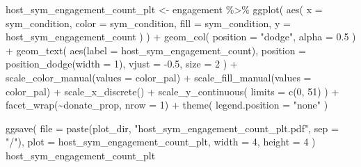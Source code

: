 \documentclass[
]{book}
\newenvironment{Shaded}{\begin{snugshade}}{\end{snugshade}}
\newcommand{\AttributeTok}[1]{\textcolor[rgb]{0.77,0.63,0.00}{#1}}
\newcommand{\DecValTok}[1]{\textcolor[rgb]{0.00,0.00,0.81}{#1}}
\newcommand{\FloatTok}[1]{\textcolor[rgb]{0.00,0.00,0.81}{#1}}
\newcommand{\FunctionTok}[1]{\textcolor[rgb]{0.00,0.00,0.00}{#1}}
\newcommand{\NormalTok}[1]{#1}
\newcommand{\OtherTok}[1]{\textcolor[rgb]{0.56,0.35,0.01}{#1}}
\newcommand{\SpecialCharTok}[1]{\textcolor[rgb]{0.00,0.00,0.00}{#1}}
\newcommand{\StringTok}[1]{\textcolor[rgb]{0.31,0.60,0.02}{#1}}
\begin{document}
\begin{Shaded}
\begin{Highlighting}[]
\NormalTok{host\_sym\_engagement\_count\_plt }\OtherTok{\textless{}{-}}\NormalTok{ engagement }\SpecialCharTok{\%\textgreater{}\%}
  \FunctionTok{ggplot}\NormalTok{(}
    \FunctionTok{aes}\NormalTok{(}
      \AttributeTok{x =}\NormalTok{ sym\_condition,}
      \AttributeTok{color =}\NormalTok{ sym\_condition,}
      \AttributeTok{fill =}\NormalTok{ sym\_condition,}
      \AttributeTok{y =}\NormalTok{ host\_sym\_engagement\_count}
\NormalTok{    )}
\NormalTok{  ) }\SpecialCharTok{+}
  \FunctionTok{geom\_col}\NormalTok{(}
    \AttributeTok{position =} \StringTok{"dodge"}\NormalTok{,}
    \AttributeTok{alpha =} \FloatTok{0.5}
\NormalTok{  ) }\SpecialCharTok{+}
  \FunctionTok{geom\_text}\NormalTok{(}
    \FunctionTok{aes}\NormalTok{(}\AttributeTok{label =}\NormalTok{ host\_sym\_engagement\_count),}
    \AttributeTok{position =} \FunctionTok{position\_dodge}\NormalTok{(}\AttributeTok{width =} \DecValTok{1}\NormalTok{),}
    \AttributeTok{vjust =} \SpecialCharTok{{-}}\FloatTok{0.5}\NormalTok{,}
    \AttributeTok{size =} \DecValTok{2}
\NormalTok{  ) }\SpecialCharTok{+}
  \FunctionTok{scale\_color\_manual}\NormalTok{(}\AttributeTok{values =}\NormalTok{ color\_pal) }\SpecialCharTok{+}
  \FunctionTok{scale\_fill\_manual}\NormalTok{(}\AttributeTok{values =}\NormalTok{ color\_pal) }\SpecialCharTok{+}
  \FunctionTok{scale\_x\_discrete}\NormalTok{() }\SpecialCharTok{+}
  \FunctionTok{scale\_y\_continuous}\NormalTok{(}
    \AttributeTok{limits =} \FunctionTok{c}\NormalTok{(}\DecValTok{0}\NormalTok{, }\DecValTok{51}\NormalTok{)}
\NormalTok{  ) }\SpecialCharTok{+}
  \FunctionTok{facet\_wrap}\NormalTok{(}\SpecialCharTok{\textasciitilde{}}\NormalTok{donate\_prop, }\AttributeTok{nrow =} \DecValTok{1}\NormalTok{) }\SpecialCharTok{+}
  \FunctionTok{theme}\NormalTok{(}
    \AttributeTok{legend.position =} \StringTok{"none"}
\NormalTok{  )}

\FunctionTok{ggsave}\NormalTok{(}
  \AttributeTok{file =} \FunctionTok{paste}\NormalTok{(plot\_dir, }\StringTok{"host\_sym\_engagement\_count\_plt.pdf"}\NormalTok{, }\AttributeTok{sep =} \StringTok{"/"}\NormalTok{),}
  \AttributeTok{plot =}\NormalTok{ host\_sym\_engagement\_count\_plt,}
  \AttributeTok{width =} \DecValTok{4}\NormalTok{,}
  \AttributeTok{height =} \DecValTok{4}
\NormalTok{)}
\NormalTok{host\_sym\_engagement\_count\_plt}
\end{Highlighting}
\end{Shaded}
\end{document}
